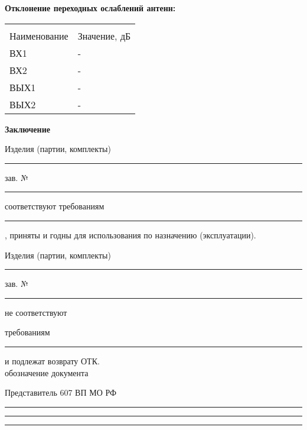 \documentclass[a4paper, 8pt]{article}
\newcommand{\InputA}[1][-]{#1}
\newcommand{\InputB}[1][-]{#1}
\newcommand{\OutputA}[1][-]{#1}
\newcommand{\OutputB}[1][-]{#1}
\begin{document}


\vspace{1.0cm} %
\centering
{ \textbf{Отклонение переходных ослаблений антенн:} \  }   
\vspace{0.5cm}

\begin{tabular}{| >{\centering\arraybackslash}m{9.5cm} | >{\centering\arraybackslash}m{9.65cm} |}\hline
	& \\ [-1em] %
	Наименование & Значение, дБ \\
	\hline	
	ВХ1 & \InputA \\
	\hline 
	ВХ2 & \InputB \\
	\hline 
	ВЫХ1 & \OutputA \\ 
	\hline  
	ВЫХ2 & \OutputB \\  
	\hline 
	
\end{tabular}
	
	
	\vspace{1.5cm} %
	\centering
	{ \large\textbf{Заключение} \  }   
	\vspace{1.0cm}
	
	Изделия (партии, комплекты) \rule[+0.0mm]{2cm}{0.1mm}  \hsize  зав. №  \hsize \rule[+0.0mm]{6cm}{0.1mm}   соответствуют требованиям 
	\newline  %
	
	\rule[+0.0mm]{4cm}{0.1mm} , приняты и годны для использования по назначению (эксплуатации).
	\newline  %
	
	Изделия (партии, комплекты) \rule[+0.0mm]{3cm}{0.1mm}  \hsize  зав. №  \hsize \rule[+0.0mm]{6cm}{0.1mm}  не соответствуют 
	\newline  %
	
	требованиям \hsize \rule[+0.0mm]{6cm}{0.1mm} и подлежат возврату ОТК. \\
	\hsize обозначение документа  
	\newline   %
	
	Представитель 607 ВП МО РФ  \hsize \rule[+0.0mm]{2.6cm}{0.1mm}  \hsize \rule[+0.0mm]{4.3cm}{0.1mm}  \hsize \rule[+0.0mm]{2.5cm}{0.1mm}  \hsize \\
	
\end{document}
